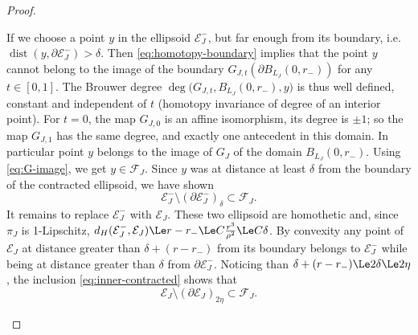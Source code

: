 \begin{proof}
\begin{enumerate}
      If we choose a point $y$ in the ellipsoid $\mathcal{E}_J^-$, but
      far enough from its boundary, i.e. $\operatorname{dist}
      (y,\partial\mathcal{E}_J^-) >\delta$. Then
      \eqref{eq:homotopy-boundary} implies that the point $y$ cannot
      belong to the image of the boundary $G_{J,t}(\partial
      B_{L_J}(0,r_-))$ for any $t\in[0,1]$.  The Brouwer degree
      $\deg\bigl( G_{J,t}, B_{L_J}(0,r_-), y \bigr)$ is thus well
      defined, constant and independent of $t$ (homotopy invariance of
      degree of an interior point). For $t=0$, the map $G_{J,0}$ is an
      affine isomorphism, its degree is $\pm1$; so the map $G_{J,1}$
      has the same degree, and exactly one antecedent in this
      domain. In particular point $y$ belongs to the image of $G_J$ of
      the domain $B_{L_J}(0,r_-)$. Using \eqref{eq:G-image}, we get
      $y\in \mathcal{F}_J$. Since $y$ was at distance at least
      $\delta$ from the boundary of the contracted ellipsoid, we have
      shown
      \begin{equation}
        \label{eq:inner-contracted}
        \mathcal{E}_J^- \setminus (\partial\mathcal{E}_J^-)_{\delta} \subset \mathcal{F}_J.
      \end{equation}
      It remains to replace $\mathcal{E}_J^-$ with
      $\mathcal{E}_J$. These two ellipsoid are homothetic and, since
      $\pi_J$ is 1-Lipschitz, $d_H(\mathcal{E}_J^-,\mathcal{E}_J) \Le
      r-r_- \Le C\frac{r^3}{\rho^2} \Le C\delta$.  By convexity any
      point of $\mathcal{E}_J$ at distance greater than
      $\delta+(r-r_-)$ from its boundary belongs to $\mathcal{E}_J^-$
      while being at distance greater than $\delta$ from $\partial
      \mathcal{E}_J^-$. Noticing than $\delta + (r-r_-)\Le 2\delta \Le 2\eta$, the
      inclusion \eqref{eq:inner-contracted} shows that
      \begin{equation}
        \label{eq:inner-final}
        \mathcal{E}_J
        \setminus
        (\partial\mathcal{E}_J)_{2\eta}
        \subset \mathcal{F}_J.
      \end{equation}


\end{enumerate}
\end{proof}
